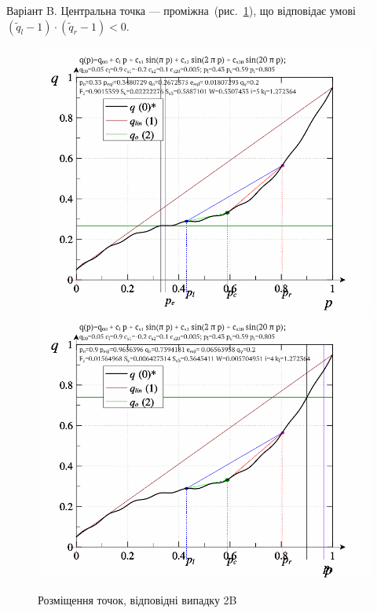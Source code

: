 Варіант B.\label{atu:d:p_eql_2B} %
%
Центральна точка --- проміжна~(рис.~\ref{atu:f:pq_2B}),
що відповідає умові
$( \tilde{q}_l -1 ) \cdot ( \tilde{q}_r -1 ) < 0$.

\begin{figure}[htb!]
  \begin{center}
    \includegraphics[width=49\TW]{p/pq_sin-p_pq_po=033.png}
    \hfill
    \includegraphics[width=49\TW]{p/pq_sin-p_pq_po=090.png}
  \end{center}
  \caption{Розміщення точок, відповідні випадку 2B}
  \label{atu:f:pq_2B}
\end{figure}

